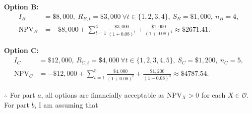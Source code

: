 \documentclass[12pt]{article}
\begin{document}
\textbf{Option B:}
\[
\begin{aligned}
I_B &= \$8,000, \ R_{B,t} = \$3,000 \ \forall t \in \{1, 2, 3, 4\}, \ S_B = \$1,000, \ n_B = 4, \\
\text{NPV}_B &= -\$8,000 + \sum_{t=1}^{4} \frac{\$3,000}{(1 + 0.08)^t} + \frac{\$1,000}{(1 + 0.08)^4} \approx \$2671.41.
\end{aligned}
\]

\textbf{Option C:}
\[
\begin{aligned}
I_C &= \$12,000, \ R_{C,t} = \$4,000 \ \forall t \in \{1, 2, 3, 4, 5\}, \ S_C = \$1,200, \ n_C = 5, \\
\text{NPV}_C &= -\$12,000 + \sum_{t=1}^{5} \frac{\$4,000}{(1 + 0.08)^t} + \frac{\$1,200}{(1 + 0.08)^5} \approx \$4787.54.
\end{aligned}
\]

\(\therefore \) For part \(a\), all options are financially acceptable as \(\text{NPV}_X > 0\) for each \(X \in \mathcal{O}\). For part \(b\), I am assuming that
\end{document}

